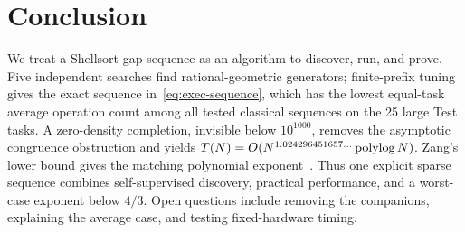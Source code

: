 \section{Conclusion}
\label{sec:conclusion}

We treat a Shellsort gap sequence as an algorithm to discover, run, and prove.
Five independent searches find rational-geometric generators; finite-prefix
tuning gives the exact sequence in~\cref{eq:exec-sequence}, which has the lowest
equal-task average operation count among all tested classical sequences on the
25 large Test tasks.  A zero-density completion, invisible below $10^{1000}$,
removes the asymptotic congruence obstruction and yields
$T(N)=O(N^{1.024296451657\ldots}\operatorname{polylog} N)$.  Zang's lower bound gives the
matching polynomial exponent~\cite{zang2026}.  Thus one explicit sparse
sequence combines self-supervised discovery, practical performance, and a
worst-case exponent below $4/3$.  Open questions include removing the
companions, explaining the average case, and testing fixed-hardware timing.
